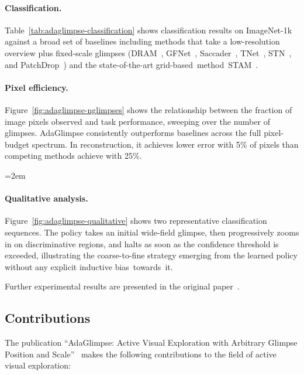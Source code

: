\paragraph{Classification.} Table~\ref{tab:adaglimpse-classification} shows classification results on ImageNet-1k against a broad set of baselines including methods that take a low-resolution overview plus fixed-scale glimpses (DRAM~\cite{ba2015multiple}, GFNet~\cite{wang2020glance}, Saccader~\cite{elsayed2019saccader}, TNet~\cite{papadopoulos2021hard}, STN~\cite{recasens2018learning}, and PatchDrop~\cite{uzkent2020learning}) and the state-of-the-art grid-based~method~STAM~\cite{rangrej2022consistency}.

\paragraph{Pixel efficiency.} Figure~\ref{fig:adaglimpse-nglimpses} shows the relationship between the fraction of image pixels observed and task performance, sweeping over the number of glimpses. AdaGlimpse consistently outperforms baselines across the full pixel-budget spectrum. In reconstruction, it achieves lower error with 5\% of pixels than competing methods achieve with 25\%.


{\emergencystretch=2em \paragraph{Qualitative analysis.} Figure~\ref{fig:adaglimpse-qualitative} shows two representative classification sequences. The policy takes an initial wide-field glimpse, then progressively zooms in on discriminative regions, and halts as soon as the confidence threshold is exceeded, illustrating the coarse-to-fine strategy emerging from the learned policy without any explicit inductive \mbox{bias towards it}.\par}

Further experimental results are presented in the original paper~.

\subsection{Contributions}
\label{sec:contributions-adaglimpse}

The publication ``AdaGlimpse: Active Visual Exploration with Arbitrary Glimpse Position and Scale''~ makes the following contributions to the field of active visual exploration:

